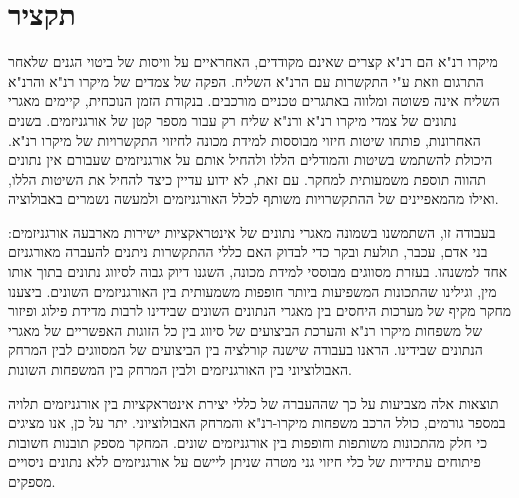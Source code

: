 \chapter*{תקציר}

מיקרו רנ"א הם רנ"א קצרים שאינם מקודדים, האחראיים על וויסות של ביטוי הגנים שלאחר התרגום וזאת ע"י התקשרות עם הרנ"א השליח. הפקה של צמדים של מיקרו רנ"א והרנ"א השליח אינה פשוטה ומלווה באתגרים טכניים מורכבים. בנקודת הזמן הנוכחית, קיימים מאגרי נתונים של צמדי מיקרו רנ"א ורנ"א שליח רק עבור מספר קטן של אורגניזמים. בשנים האחרונות, פותחו שיטות חיזוי מבוססות למידת מכונה לחיזוי התקשרויות של מיקרו רנ"א. היכולת להשתמש בשיטות והמודלים הללו ולהחיל אותם על אורגניזמים שעבורם אין נתונים תהווה תוספת משמעותית למחקר. עם זאת, לא ידוע עדיין כיצד להחיל את השיטות הללו, ואילו מהמאפיינים של ההתקשרויות משותף לכלל האורגניזמים ולמעשה נשמרים באבולוציה.

\vspace{5mm} %

בעבודה זו, השתמשנו בשמונה מאגרי נתונים של אינטראקציות ישירות מארבעה אורגניזמים: בני אדם, עכבר, תולעת ובקר כדי לבדוק האם כללי ההתקשרות ניתנים להעברה מאורגניזם אחד למשנהו. בעזרת מסווגים מבוססי למידת מכונה, השגנו דיוק גבוה לסיווג נתונים בתוך אותו מין, וגילינו שהתכונות המשפיעות ביותר חופפות משמעותית בין האורגניזמים השונים. ביצענו מחקר מקיף של מערכות היחסים בין מאגרי הנתונים השונים שבידינו לרבות מדידת פילוג ופיזור של משפחות מיקרו רנ"א והערכת הביצועים של סיווג בין כל הזוגות האפשריים של מאגרי הנתונים שבידינו. הראנו בעבודה שישנה קורלציה בין הביצועים של המסווגים לבין המרחק האבולוציוני בין האורגניזמים ולבין המרחק בין המשפחות השונות.

\vspace{5mm} %


תוצאות אלה מצביעות על כך שההעברה של כללי יצירת אינטראקציות בין אורגניזמים תלויה במספר גורמים, כולל הרכב משפחות מיקרו-רנ"א והמרחק האבולוציוני. יתר על כן, אנו מציגים כי חלק מהתכונות משותפות וחופפות בין אורגניזמים שונים. המחקר מספק תובנות חשובות פיתוחים עתידיות של כלי חיזוי גני מטרה שניתן ליישם על אורגניזמים ללא נתונים ניסויים מספקים.


